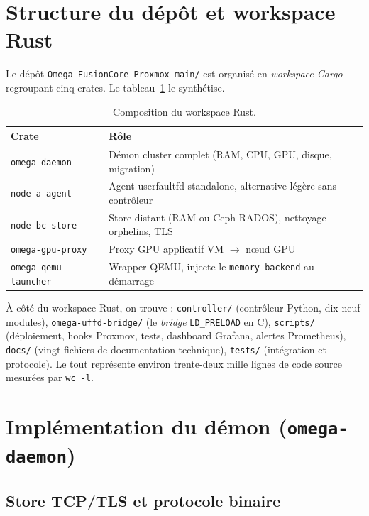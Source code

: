 \section{Structure du dépôt et workspace Rust}
\label{sec:dep}

Le dépôt \texttt{Omega\_FusionCore\_Proxmox-main/} est organisé en \emph{workspace Cargo} regroupant cinq crates. Le tableau~\ref{tab:workspace} le synthétise.

\begin{table}[H]
\centering
\small
\caption{Composition du workspace Rust.}
\begin{tabular}{lp{9cm}}
\toprule
\textbf{Crate} & \textbf{Rôle} \\
\midrule
\texttt{omega-daemon}            & Démon cluster complet (RAM, CPU, GPU, disque, migration) \\
\texttt{node-a-agent}            & Agent userfaultfd standalone, alternative légère sans contrôleur \\
\texttt{node-bc-store}           & Store distant (RAM ou Ceph RADOS), nettoyage orphelins, TLS \\
\texttt{omega-gpu-proxy}         & Proxy GPU applicatif VM $\rightarrow$ nœud GPU \\
\texttt{omega-qemu-launcher}     & Wrapper QEMU, injecte le \texttt{memory-backend} au démarrage \\
\bottomrule
\end{tabular}

\label{tab:workspace}
\end{table}

À côté du workspace Rust, on trouve : \texttt{controller/} (contrôleur Python, dix-neuf modules), \texttt{omega-uffd-bridge/} (le \emph{bridge} \texttt{LD\_PRELOAD} en C), \texttt{scripts/} (déploiement, hooks Proxmox, tests, dashboard Grafana, alertes Prometheus), \texttt{docs/} (vingt fichiers de documentation technique), \texttt{tests/} (intégration et protocole). Le tout représente environ trente-deux mille lignes de code source mesurées par \texttt{wc~-l}.

\section{Implémentation du démon (\texttt{omega-daemon})}
\label{sec:impl-daemon}

\subsection{Store TCP/TLS et protocole binaire}

